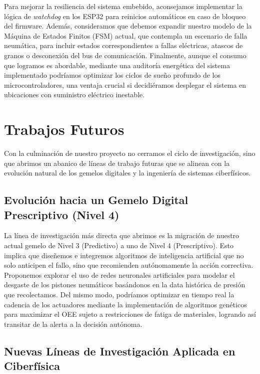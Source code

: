 Para mejorar la resiliencia del sistema embebido, aconsejamos implementar la lógica de \textit{watchdog} en los ESP32 para reinicios automáticos en caso de bloqueo del firmware. Además, consideramos que debemos expandir nuestro modelo de la Máquina de Estados Finitos (FSM) actual, que contempla un escenario de falla neumática, para incluir estados correspondientes a fallas eléctricas, atascos de granos o desconexión del bus de comunicación. Finalmente, aunque el consumo que logramos es abordable, mediante una auditoría energética del sistema implementado podríamos optimizar los ciclos de sueño profundo de los microcontroladores, una ventaja crucial si decidiéramos desplegar el sistema en ubicaciones con suministro eléctrico inestable.

\section{Trabajos Futuros}

Con la culminación de nuestro proyecto no cerramos el ciclo de investigación, sino que abrimos un abanico de líneas de trabajo futuras que se alinean con la evolución natural de los gemelos digitales y la ingeniería de sistemas ciberfísicos.

\subsection{Evolución hacia un Gemelo Digital Prescriptivo (Nivel 4)}

La línea de investigación más directa que abrimos es la migración de nuestro actual gemelo de Nivel 3 (Predictivo) a uno de Nivel 4 (Prescriptivo). Esto implica que diseñemos e integremos algoritmos de inteligencia artificial que no solo anticipen el fallo, sino que recomienden autónomamente la acción correctiva. Proponemos explorar el uso de redes neuronales artificiales para modelar el desgaste de los pistones neumáticos basándonos en la data histórica de presión que recolectamos. Del mismo modo, podríamos optimizar en tiempo real la cadencia de los actuadores mediante la implementación de algoritmos genéticos para maximizar el OEE sujeto a restricciones de fatiga de materiales, logrando así transitar de la alerta a la decisión autónoma.

\subsection{Nuevas Líneas de Investigación Aplicada en Ciberfísica}


